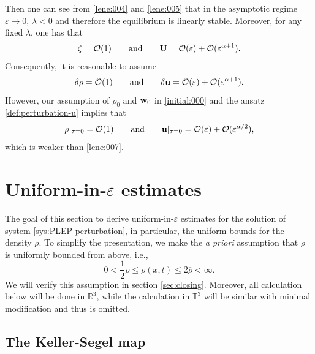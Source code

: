 \documentclass[11pt]{article}
\theoremstyle{plain}
\theoremstyle{definition}
\theoremstyle{remark}
\renewcommand{\vec}[1]{{\bf #1}}
\numberwithin{equation}{section}
\begin{document}
Then one can see from \eqref{lene:004} and \eqref{lene:005} that in the asymptotic regime $ \varepsilon \rightarrow 0 $, $ \lambda < 0 $ and therefore the equilibrium is linearly stable. Moreover, for any fixed $ \lambda $, one has that
\begin{equation}
    \label{lene:006}
    \zeta = \mathcal O(1) \qquad \text{and} \qquad \vec U = \mathcal O(\varepsilon) + \mathcal O(\varepsilon^{\alpha+1}).
\end{equation}
Consequently, it is reasonable to assume 
\begin{equation}
    \label{lene:007}
    \delta \rho = \mathcal O(1) \qquad \text{and} \qquad \delta \vec u = \mathcal O(\varepsilon) + \mathcal O(\varepsilon^{\alpha+1}).
\end{equation}
However, our assumption of $ \rho_0 $ and $ \vec w_0 $ in \eqref{initial:000} and the ansatz \eqref{def:perturbation-u} implies that
\begin{equation}
    \label{lene:008}
    \rho\vert_{\tau=0} = \mathcal O(1) \qquad \text{and} \qquad \vec u\vert_{\tau=0} = \mathcal O(\varepsilon) + \mathcal O(\varepsilon^{\alpha/2}), 
\end{equation}
which is weaker than \eqref{lene:007}. 





\section{Uniform-in-$\varepsilon$ estimates}
\label{sec:uniform-estimates}

The goal of this section to derive uniform-in-$\varepsilon $ estimates for the solution of system \eqref{sys:PLEP-perturbation}, in particular, the uniform bounds for the density $ \rho $. To simplify the presentation, we make the {\it a priori} assumption that $ \rho $ is uniformly bounded from above, i.e., 
\begin{equation}
    \label{ass-prior:rho}
    0 < \frac{1}{2} \underline{\rho} \leq \rho(x,t) \leq 2 \overline \rho  < \infty. 
\end{equation}
We will verify this assumption in section \ref{sec:closing}. Moreover, all calculation below will be done in $ \mathbb R^3 $, while the calculation in $ \mathbb T^3 $ will be similar with minimal modification and thus is omitted. 

\subsection{The Keller-Segel map}
\end{document}
